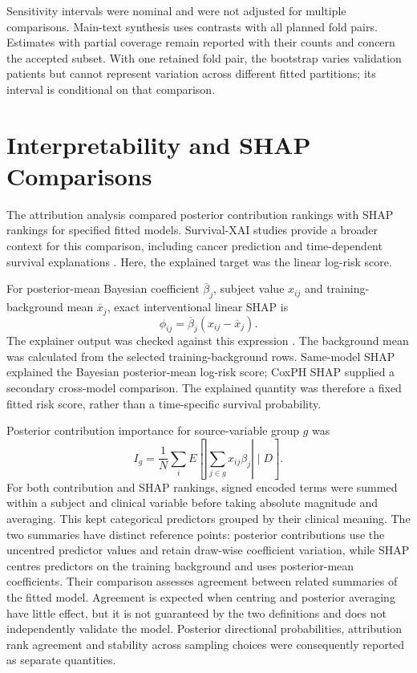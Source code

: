 Sensitivity intervals were nominal and were not adjusted for multiple comparisons. Main-text synthesis uses contrasts with all planned fold pairs. Estimates with partial coverage remain reported with their counts and concern the accepted subset. With one retained fold pair, the bootstrap varies validation patients but cannot represent variation across different fitted partitions; its interval is conditional on that comparison.

\section{Interpretability and SHAP Comparisons}\label{interpretability-shap-boundary-and-permutation-importance}

The attribution analysis compared posterior contribution rankings with SHAP rankings for specified fitted models. Survival-XAI studies provide a broader context for this comparison, including cancer prediction and time-dependent survival explanations \cite{ref28,ref30,ref60}. Here, the explained target was the linear log-risk score.

For posterior-mean Bayesian coefficient $\overline\beta_j$, subject value $x_{ij}$ and training-background mean $\overline x_j$, exact interventional linear SHAP is
\begin{equation}
\phi_{ij}=\overline\beta_j(x_{ij}-\overline x_j).
\end{equation}
The explainer output was checked against this expression \cite{lundberg2017,shaplinear}. The background mean was calculated from the selected training-background rows. Same-model SHAP explained the Bayesian posterior-mean log-risk score; CoxPH SHAP supplied a secondary cross-model comparison. The explained quantity was therefore a fixed fitted risk score, rather than a time-specific survival probability.

Posterior contribution importance for source-variable group $g$ was
\begin{equation}
I_g=\frac{1}{N}\sum_i E\left[\left|\sum_{j\in g}x_{ij}\beta_j\right|\mid D\right].
\end{equation}
For both contribution and SHAP rankings, signed encoded terms were summed within a subject and clinical variable before taking absolute magnitude and averaging. This kept categorical predictors grouped by their clinical meaning. The two summaries have distinct reference points: posterior contributions use the uncentred predictor values and retain draw-wise coefficient variation, while SHAP centres predictors on the training background and uses posterior-mean coefficients. Their comparison assesses agreement between related summaries of the fitted model. Agreement is expected when centring and posterior averaging have little effect, but it is not guaranteed by the two definitions and does not independently validate the model. Posterior directional probabilities, attribution rank agreement and stability across sampling choices were consequently reported as separate quantities.

